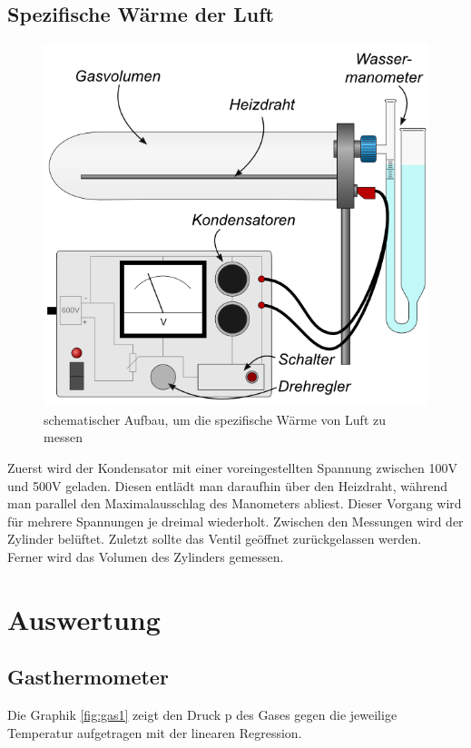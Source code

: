 \documentclass[12pt,a4paper,titlepage,headinclude,bibtotoc]{scrartcl}
\begin{document}
\subsection{Spezifische Wärme der Luft}
\begin{figure}[!htb]
 \centering
 \includegraphics[scale=0.7]{SpezWaermeSkizze.jpg}
 \caption{schematischer Aufbau, um die spezifische Wärme von Luft zu messen \cite{lp}}
 \label{fig:SWLSkizze}
\end{figure}
Zuerst wird der Kondensator mit einer voreingestellten Spannung zwischen 100V und 500V geladen.
Diesen entlädt man daraufhin über den Heizdraht, während man parallel den Maximalausschlag des Manometers abliest.
Dieser Vorgang wird für mehrere Spannungen je dreimal wiederholt.
Zwischen den Messungen wird der Zylinder belüftet.
Zuletzt sollte das Ventil geöffnet zurückgelassen werden.\\
Ferner wird das Volumen des Zylinders gemessen.

\section{Auswertung}
\label{sec:auswertung}

\subsection{Gasthermometer}
Die Graphik \ref{fig:gas1} zeigt den Druck p des Gases gegen die jeweilige Temperatur aufgetragen mit der linearen Regression.
\end{document}
